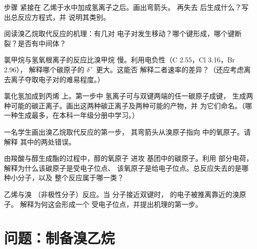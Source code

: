 \begin{exercise}[$\star\star$]\label{exo:g12:curly-arrows:9}
步骤  紧接在
乙烯于水中加成氢离子之后。画出弯箭头。
再失去  后生成什么？写出总反应方程式，并
说明其类别。
\end{exercise}

\begin{exercise}[$\star\star$]\label{exo:g12:curly-arrows:10}
阅读溴乙烷取代反应的机理：有几对
电子对发生移动？哪个键形成，哪个键断裂？是否有中间体？
\end{exercise}

\begin{exercise}[$\star\star$]\label{exo:g12:curly-arrows:11}
氯甲烷与氢氧根离子的反应比溴甲烷
慢。利用电负性（C 2.55，Cl 3.16，Br 2.96），
解释哪个碳原子的 $\delta^+$ 更大。这能否
解释二者速率的差异？（还应考虑离去离子夺取电子对的难易程度。）
\end{exercise}

\begin{exercise}[$\star\star\star$]\label{exo:g12:curly-arrows:12}
氯化氢加成到丙烯  上。第一步中
氢离子可与双键两端的任一碳原子成键，
生成两种可能的碳正离子。画出这两种碳正离子及两种可能的产物，并
为它们命名。（哪一种生成最多，在本科一年级分册中学习。）
\end{exercise}

\begin{exercise}[$\star\star\star$]\label{exo:g12:curly-arrows:13}
一名学生画出溴乙烷取代反应的第一步，
其弯箭头从溴原子指向  中的氧原子。请解释
其中的两处错误。
\end{exercise}

\begin{exercise}[$\star\star\star$]\label{exo:g12:curly-arrows:14}
由羧酸与醇生成酯的过程中，醇的氧原子
进攻  基团中的碳原子。利用
部分电荷，解释为什么该碳原子是受电子位点、
该氧原子是给电子位点。总反应失去的是哪种小分子，以及
整个反应属于哪一类？
\end{exercise}

\begin{exercise}[$\star\star\star$]\label{exo:g12:curly-arrows:15}
乙烯与溴 （非极性分子）反应。当 
分子接近双键时， 的电子被推离靠近的溴原子。
解释为何这会形成一个
受电子位点，并提出机理的第一步。
\end{exercise}

\section{问题：制备溴乙烷}

